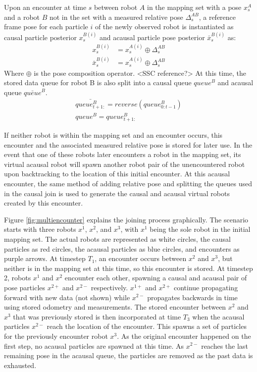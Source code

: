 Upon an encounter at time $s$ between robot $A$ in the mapping set with a pose $x_s^A$ and a robot $B$ not in the set with a measured relative pose $\Delta_s^{AB}$, a reference frame pose for each particle $i$ of the newly observed robot is instantiated as causal particle posterior $x_s^{B(i)}$ and acausal particle pose posterior $\bar{x}_s^{B(i)}$ as:
\begin{align*}
x_s^{B(i)} &= x_s^{A(i)} \oplus \Delta_s^{AB} \\
\bar{x}_s^{B(i)} &= x_s^{A(i)} \oplus \Delta_s^{AB}
\end{align*}
Where $\oplus$ is the pose composition operator. <SSC reference?>
At this time, the stored data queue for robot B is also split into a causal queue $queue^B$ and acausal queue $\bar{queue}^B$.
\begin{align*}
\bar{queue_{t+1:}^B} = reverse(queue_{0:t-1}^B) \\
queue^B = queue_{t+1:}^B
\end{align*}

If neither robot is within the mapping set and an encounter occurs, this encounter and the associated measured relative pose is stored for later use. In the event that one of these robots later encounters a robot in the mapping set, its virtual acausal robot will spawn another robot pair of the unencountered robot upon backtracking to the location of this initial encounter. At this acausal encounter, the same method of adding relative pose and splitting the queues used in the causal join is used to generate the causal and acausal virtual robots created by this encounter.

Figure \ref{fig:multiencounter} explains the joining process graphically. The scenario starts with three robots $x^1$, $x^2$, and $x^3$, with $x^1$ being the sole robot in the initial mapping set. The actual robots are represented as white circles, the causal particles as red circles, the acausal particles as blue circles, and encounters as purple arrows. At timestep $T_1$, an encounter occurs between $x^2$ and $x^3$, but neither is in the mapping set at this time, so this encounter is stored. At timestep 2, robots $x^1$ and $x^2$ encounter each other, spawning a causal and acausal pair of pose particles $x^{2+}$ and $x^{2-}$ respectively. $x^{1+}$ and $x^{2+}$ continue propagating forward with new data (not shown) while $x^{2-}$ propagates backwards in time using stored odometry and measurements. The stored encounter between $x^2$ and $x^3$ that was previously stored is then incorporated at time $T_3$ when the acausal particles $x^{2-}$ reach the location of the encounter. This spawns a set of particles for the previously encounter robot $x^3$. As the original encounter happened on the first step, no acausal particles are spawned at this time. As $x^{2-}$ reaches the last remaining pose in the acausal queue, the particles are removed as the past data is exhausted.

